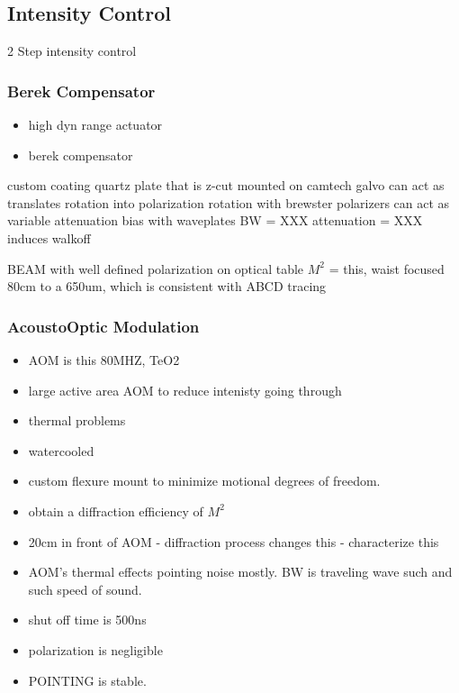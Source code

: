 \documentclass[twocolumn,aps,pra,showpacs,preprintnumbers,bibnotes]{revtex4-1}
\begin{document}
\subsection{Intensity Control}
2 Step intensity control

\subsubsection{Berek Compensator}
\begin{itemize}
\item high dyn range actuator
\item berek compensator
\end{itemize}

custom coating quartz plate that is z-cut mounted on camtech galvo
can act as translates rotation into polarization rotation
with brewster polarizers can act as variable attenuation
bias with waveplates
BW = XXX
attenuation = XXX
induces walkoff

BEAM with well defined polarization on optical table 
$M^2$ = this, waist focused 80cm to a 650um, which is consistent with ABCD tracing

\subsubsection{AcoustoOptic Modulation}

\begin{itemize}
    \item AOM is this 80MHZ, TeO2
    \item large active area AOM to reduce intenisty going through
    \item thermal problems
    \item watercooled
    \item custom flexure mount to minimize motional degrees of freedom.
    \item obtain a diffraction efficiency of $M^2$
    \item 20cm in front of AOM - diffraction process changes this - characterize this
    \item AOM's thermal effects pointing noise mostly. BW is traveling wave such and such speed of sound.
    \item shut off time is 500ns
    \item polarization is negligible
    \item POINTING is stable.
\end{itemize}
\end{document}

